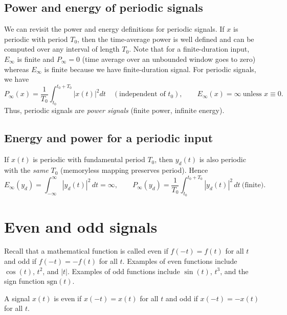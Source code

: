 \documentclass{ee102_notes}
\begin{document}

\subsection{Power and energy of periodic signals}
We can revisit the power and energy definitions for periodic signals. If $x$ is periodic with period $T_0$, then the time-average power is well defined and can be computed over any interval of length $T_0$. Note that for a finite-duration input, $E_\infty$ is finite and $P_\infty=0$ (time average over an unbounded window goes to zero) whereas $E_\infty$ is finite because we have finite-duration signal. For periodic signals, we have
\[
P_\infty(x)=\frac{1}{T_0}\!\int_{t_0}^{t_0+T_0}\!|x(t)|^2 dt
\quad(\text{independent of }t_0),\qquad
E_\infty(x)=\infty\ \text{unless }x\equiv 0.
\]
Thus, periodic signals are \emph{power signals} (finite power, infinite energy).
\subsection*{Energy and power for a periodic input}
If $x(t)$ is periodic with fundamental period $T_0$, then $y_d(t)$ is also periodic with the \emph{same} $T_0$ (memoryless mapping preserves period). Hence
\[
E_\infty(y_d)=\int_{-\infty}^{\infty}\!|y_d(t)|^2\,dt=\infty,\qquad
P_\infty(y_d)=\frac{1}{T_0}\int_{t_0}^{t_0+T_0}\!|y_d(t)|^2\,dt\ \text{(finite)}.
\]

\section{Even and odd signals}
Recall that a mathematical function is called even if $f(-t)=f(t)$ for all $t$ and odd if $f(-t)=-f(t)$ for all $t$. Examples of even functions include $\cos(t)$, $t^2$, and $|t|$. Examples of odd functions include $\sin(t)$, $t^3$, and the sign function $\text{sgn}(t)$.
\begin{definition} A signal $x(t)$ is even if $x(-t)=x(t)$ for all $t$ and odd if $x(-t)=-x(t)$ for all $t$.
\end{definition}
\end{document}

